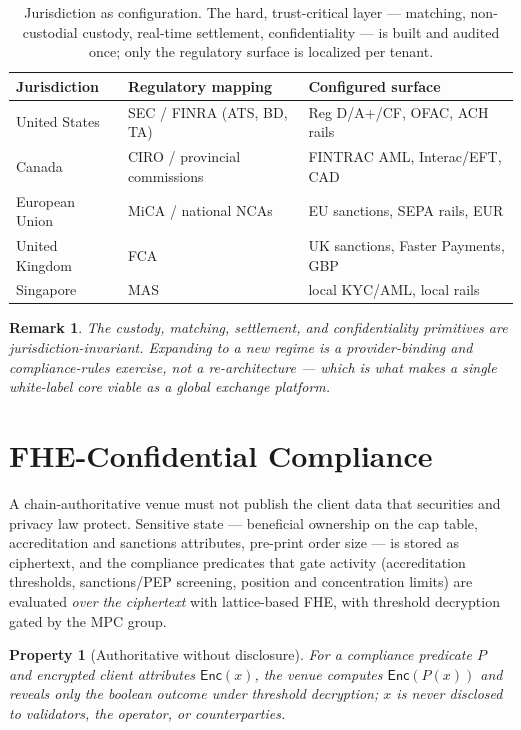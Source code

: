 \documentclass[11pt,a4paper]{article}
\newtheorem{property}{Property}[section]
\newtheorem{remark}{Remark}[section]
\begin{document}
\begin{table}[h]
\centering
\small
\begin{tabular}{@{}lll@{}}
\toprule
\textbf{Jurisdiction} & \textbf{Regulatory mapping} & \textbf{Configured surface}\\
\midrule
United States & SEC / FINRA (ATS, BD, TA) & Reg D/A+/CF, OFAC, ACH rails\\
Canada & CIRO / provincial commissions & FINTRAC AML, Interac/EFT, CAD\\
European Union & MiCA / national NCAs & EU sanctions, SEPA rails, EUR\\
United Kingdom & FCA & UK sanctions, Faster Payments, GBP\\
Singapore & MAS & local KYC/AML, local rails\\
\bottomrule
\end{tabular}
\caption{Jurisdiction as configuration. The hard, trust-critical layer ---
matching, non-custodial custody, real-time settlement, confidentiality --- is
built and audited once; only the regulatory surface is localized per tenant.}
\end{table}

\begin{remark}
The custody, matching, settlement, and confidentiality primitives are
jurisdiction-invariant. Expanding to a new regime is a provider-binding and
compliance-rules exercise, not a re-architecture --- which is what makes a
single white-label core viable as a \emph{global} exchange platform.
\end{remark}

\section{FHE-Confidential Compliance}
\label{sec:fhe}

A chain-authoritative venue must not publish the client data that securities
and privacy law protect. Sensitive state --- beneficial ownership on the cap
table, accreditation and sanctions attributes, pre-print order size --- is
stored as ciphertext, and the compliance predicates that gate activity
(accreditation thresholds, sanctions/PEP screening, position and concentration
limits) are evaluated \emph{over the ciphertext} with lattice-based FHE, with
threshold decryption gated by the MPC group.

\begin{property}[Authoritative without disclosure]
For a compliance predicate $P$ and encrypted client attributes
$\mathsf{Enc}(x)$, the venue computes $\mathsf{Enc}(P(x))$ and reveals only the
boolean outcome under threshold decryption; $x$ is never disclosed to
validators, the operator, or counterparties.
\end{property}
\end{document}
